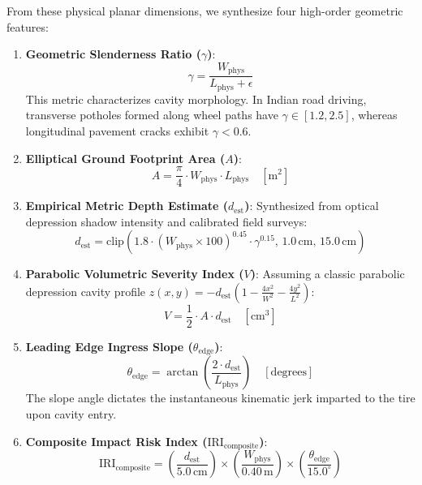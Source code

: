 From these physical planar dimensions, we synthesize four high-order geometric features:
\begin{enumerate}
    \item \textbf{Geometric Slenderness Ratio ($\gamma$)}:
    \begin{equation}
        \gamma = \frac{W_{\text{phys}}}{L_{\text{phys}} + \epsilon}
    \end{equation}
    This metric characterizes cavity morphology. In Indian road driving, transverse potholes formed along wheel paths have $\gamma \in [1.2, 2.5]$, whereas longitudinal pavement cracks exhibit $\gamma < 0.6$.
    
    \item \textbf{Elliptical Ground Footprint Area ($A$)}:
    \begin{equation}
        A = \frac{\pi}{4} \cdot W_{\text{phys}} \cdot L_{\text{phys}} \quad [\text{m}^2]
    \end{equation}
    
    \item \textbf{Empirical Metric Depth Estimate ($d_{\text{est}}$)}:
    Synthesized from optical depression shadow intensity and calibrated field surveys:
    \begin{equation}
        d_{\text{est}} = \text{clip}\left( 1.8 \cdot (W_{\text{phys}} \times 100)^{0.45} \cdot \gamma^{0.15}, \, 1.0\,\text{cm}, \, 15.0\,\text{cm} \right)
    \end{equation}
    
    \item \textbf{Parabolic Volumetric Severity Index ($V$)}:
    Assuming a classic parabolic depression cavity profile $z(x, y) = -d_{\text{est}} \left(1 - \frac{4x^2}{W^2} - \frac{4y^2}{L^2}\right)$:
    \begin{equation}
        V = \frac{1}{2} \cdot A \cdot d_{\text{est}} \quad [\text{cm}^3]
    \end{equation}
    
    \item \textbf{Leading Edge Ingress Slope ($\theta_{\text{edge}}$)}:
    \begin{equation}
        \theta_{\text{edge}} = \arctan\left( \frac{2 \cdot d_{\text{est}}}{L_{\text{phys}}} \right) \quad [\text{degrees}]
    \end{equation}
    The slope angle dictates the instantaneous kinematic jerk imparted to the tire upon cavity entry.
    
    \item \textbf{Composite Impact Risk Index ($\text{IRI}_{\text{composite}}$)}:
    \begin{equation}
        \text{IRI}_{\text{composite}} = \left( \frac{d_{\text{est}}}{5.0\,\text{cm}} \right) \times \left( \frac{W_{\text{phys}}}{0.40\,\text{m}} \right) \times \left( \frac{\theta_{\text{edge}}}{15.0^\circ} \right)
    \end{equation}
\end{enumerate}

